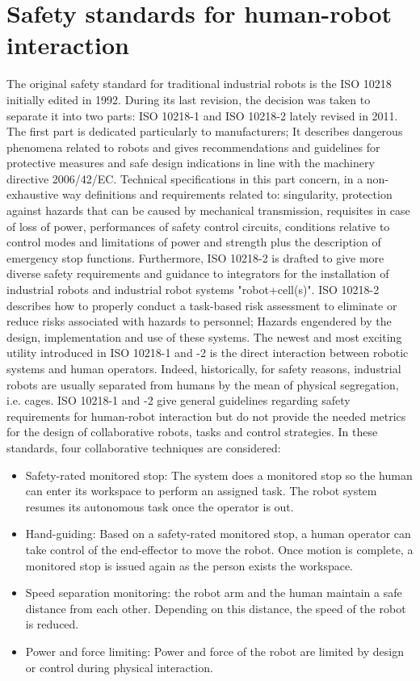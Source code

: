 \section{Safety standards for human-robot interaction}
The original safety standard for traditional industrial robots is the ISO 10218 initially edited in 1992. During its last revision, the decision was taken to separate it into two parts: ISO 10218-1 and ISO 10218-2 lately revised in 2011. The first part is dedicated particularly to manufacturers; It describes dangerous phenomena related to robots and gives recommendations and guidelines for protective measures and safe design indications in line with the machinery directive 2006/42/EC. 
Technical specifications in this part concern, in a non-exhaustive way definitions and requirements related to: singularity, protection against hazards that can be caused by mechanical transmission, requisites in case of loss of power, performances of safety control circuits, conditions relative to control modes and limitations of power and strength plus the description of emergency stop functions.
Furthermore, ISO 10218-2 is drafted to give more diverse safety requirements and guidance to integrators for the installation of industrial robots and industrial robot systems "robot+cell(s)". ISO 10218-2 describes how to properly conduct a task-based risk assessment to eliminate or reduce risks associated with hazards to personnel; Hazards engendered by the design, implementation and use of these systems. The newest and most exciting utility introduced in ISO 10218-1 and -2 is the direct interaction between robotic systems and human operators. Indeed, historically, for safety reasons, industrial robots are usually separated from humans by the mean of physical segregation, i.e. cages. ISO 10218-1 and -2 give general guidelines regarding safety requirements for human-robot interaction but do not provide the needed metrics for the design of collaborative robots, tasks and control strategies. In these standards, four collaborative techniques are considered:
\begin{itemize}
\item Safety-rated monitored stop: The system does a monitored stop so the human can enter its workspace to perform an assigned task. The robot system resumes its autonomous task once the operator is out.
\item Hand-guiding: Based on a safety-rated monitored stop, a human operator can take control of the end-effector to move the robot. Once motion is complete, a monitored stop is issued again as the person exists the workspace.
\item Speed separation monitoring: the robot arm and the human maintain a safe distance from each other. Depending on this distance, the speed of the robot is reduced.
\item Power and force limiting: Power and force of the robot are limited by design or control during physical interaction.
\end{itemize}

